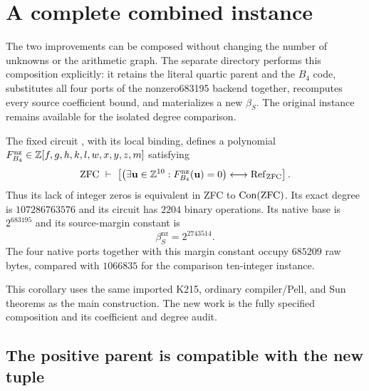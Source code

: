 \section{A complete combined instance}
\label{composed:section}

The two improvements can be composed without changing the number of
unknowns or the arithmetic graph.  The separate directory
 performs this composition explicitly:
it retains the literal quartic parent and the $B_4$ code, substitutes all
four ports of the nonzero683195 backend together, recomputes every source
coefficient bound, and materializes a new $\beta_S$.
The original  instance remains available for the
isolated degree comparison.

\begin{corollary}
\label{composed:main}
The fixed circuit
,
with its local  binding, defines a polynomial
$F^{\mathrm{nz}}_{B_4}\in\mathbb Z[f,g,h,k,l,w,x,y,z,m]$ satisfying
\[
 \mathrm{ZFC}\ \vdash\
 \left[
   \bigl(\exists\mathbf u\in\mathbb Z^{10}:
            F^{\mathrm{nz}}_{B_4}(\mathbf u)=0\bigr)
   \longleftrightarrow\operatorname{Ref}_{\mathrm{ZFC}}
 \right].
\]
Thus its lack of integer zeros is equivalent in ZFC to
$\operatorname{Con}(\mathrm{ZFC})$.  Its exact degree is $107286763576$ and its
circuit has $2204$ binary operations.  Its native base is $2^{683195}$
and its source-margin constant is
\[
 \boxed{\beta_S^{\mathrm{nz}}=2^{2743514}.}
\]
The four native ports together with this margin constant occupy
$685209$ raw bytes, compared with $1066835$ for the comparison
ten-integer instance.
\end{corollary}

This corollary uses the same imported K215, ordinary compiler/Pell,
and Sun theorems as the main construction.  The new work is the
fully specified composition and its coefficient and degree audit.

\subsection{The positive parent is compatible with the new tuple}

